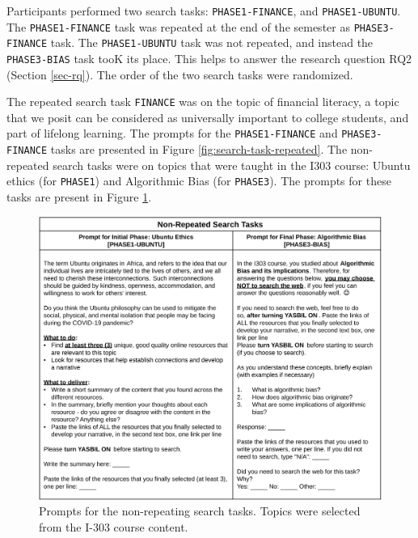 \documentclass[letterpaper, nobind]{templates/ociamthesis}
\begin{document}
Participants performed two search tasks: \texttt{PHASE1-FINANCE}, and \texttt{PHASE1-UBUNTU}.
The \texttt{PHASE1-FINANCE} task was repeated at the end of the semester as \texttt{PHASE3-FINANCE} task.
The \texttt{PHASE1-UBUNTU} task was not repeated, and instead the \texttt{PHASE3-BIAS} task tooK its place.
This helps to answer the research question RQ2 (Section \ref{sec-rq}).
The order of the two search tasks were randomized.

The repeated search task \texttt{FINANCE} was on the topic of financial literacy, a topic that we posit can be considered as universally important to college students, and part of lifelong learning.
The prompts for the \texttt{PHASE1-FINANCE} and \texttt{PHASE3-FINANCE} tasks are presented in Figure \ref{fig:search-task-repeated}.
The non-repeated search tasks were on topics that were taught in the I303 course:
Ubuntu ethics (for \texttt{PHASE1})
and
Algorithmic Bias (for \texttt{PHASE3}).
The prompts for these tasks are present in Figure \ref{fig:search-task-new}.

\begin{figure}

{\centering \includegraphics[width=1\linewidth]{figs/search-task-new} 

}

\caption[Prompts for non-repeated search task.]{Prompts for the non-repeating search tasks. Topics were selected from the I-303 course content.}\label{fig:search-task-new}
\end{figure}
\end{document}
